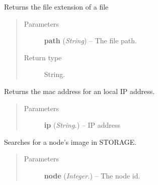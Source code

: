 \documentclass[letterpaper,10pt,english]{sphinxmanual}
\begin{document}
\begin{fulllineitems}
\label{api:utils.GetFileExtension}
Returns the file extension of a file
\begin{quote}\begin{description}
\item[{Parameters}] \leavevmode
\textbf{path} (\emph{String}) -- The file path.

\item[{Return type}] \leavevmode
String.

\end{description}\end{quote}

\end{fulllineitems}


\begin{fulllineitems}
\label{api:utils.GetMacForIp}
Returns the mac address for an local IP address.
\begin{quote}\begin{description}
\item[{Parameters}] \leavevmode
\textbf{ip} (\emph{String.}) -- IP address

\end{description}\end{quote}

\end{fulllineitems}


\begin{fulllineitems}
\label{api:utils.GetNodeImg}
Searches for a node's image in STORAGE.
\begin{quote}\begin{description}
\item[{Parameters}] \leavevmode
\textbf{node} (\emph{Integer.}) -- The node id.

\end{description}\end{quote}

\end{fulllineitems}

\end{document}
